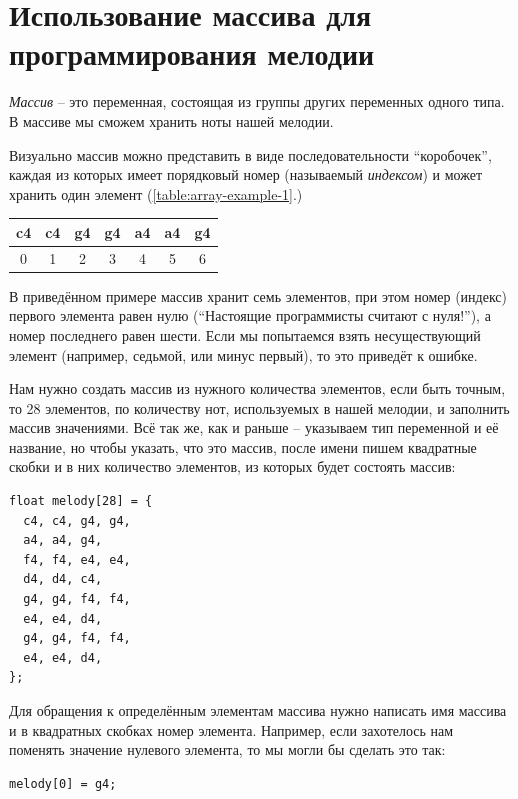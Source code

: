 \documentclass[a4paper,twoside]{book}
\begin{document}
\section{Использование массива для программирования мелодии}

\emph{Массив} -- это переменная, состоящая из группы других переменных одного
типа. В массиве мы сможем хранить ноты нашей мелодии.

Визуально массив можно представить в виде последовательности ``коробочек'',
каждая из которых имеет порядковый номер (называемый \emph{индексом}) и может
хранить один элемент (\ref{table:array-example-1}.)

\begin{tabular}{|p{1cm}|p{1cm}|p{1cm}|p{1cm}|p{1cm}|p{1cm}|p{1cm}|}
  \hline
  c4 & c4 & g4 & g4 & a4 & a4 & g4 \\
  \hline
  \multicolumn{1}{c}{0}
  & \multicolumn{1}{c}{1}
  & \multicolumn{1}{c}{2}
  & \multicolumn{1}{c}{3}
  & \multicolumn{1}{c}{4}
  & \multicolumn{1}{c}{5}
  & \multicolumn{1}{c}{6}
  \label{table:array-example-1}
\end{tabular}

В приведённом примере массив хранит семь элементов, при этом номер (индекс)
первого элемента равен нулю (``Настоящие программисты считают с нуля!''), а
номер последнего равен шести. Если мы попытаемся взять несуществующий элемент
(например, седьмой, или минус первый), то это приведёт к ошибке.

Нам нужно создать массив из нужного количества элементов, если быть точным, то
28 элементов, по количеству нот, используемых в нашей мелодии, и заполнить
массив значениями. Всё так же, как и раньше -- указываем тип переменной и её
название, но чтобы указать, что это массив, после имени пишем квадратные скобки
и в них количество элементов, из которых будет состоять массив:

\begin{verbatim}
float melody[28] = {
  c4, c4, g4, g4,
  a4, a4, g4,
  f4, f4, e4, e4,
  d4, d4, c4,
  g4, g4, f4, f4,
  e4, e4, d4,
  g4, g4, f4, f4,
  e4, e4, d4,
};
\end{verbatim}

Для обращения к определённым элементам массива нужно написать имя массива и в
квадратных скобках номер элемента. Например, если захотелось нам поменять
значение нулевого элемента, то мы могли бы сделать это так:

\begin{verbatim}
melody[0] = g4;
\end{verbatim}
\end{document}

